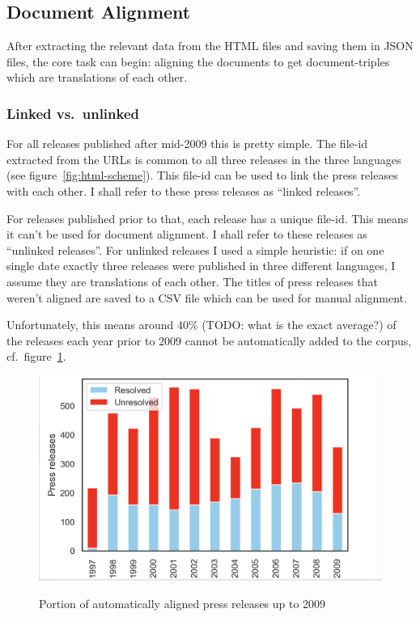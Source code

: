 \subsection{Document Alignment}
After extracting the relevant data from the HTML files and saving them in JSON files, the core task can begin: aligning the documents to get document-triples which are translations of each other.

\subsubsection{Linked vs.~unlinked}
\label{sec:linked-unlinked}
For all releases published after mid-2009 this is pretty simple. 
The file-id extracted from the URLs is common to all three releases in the three languages (see figure~\ref{fig:html-scheme}). 
This file-id can be used to link the press releases with each other. 
I shall refer to these press releases as \enquote{linked releases}.

For releases published prior to that, each release has a unique file-id. 
This means it can't be used for document alignment. 
I shall refer to these releases as \enquote{unlinked releases}.
For unlinked releases I used a simple heuristic: if on one single date exactly three releases were published in three different languages, I assume they are translations of each other. 
The titles of press releases that weren't aligned are saved to a CSV file which can be used for manual alignment.

Unfortunately, this means around 40\% (TODO: what is the exact average?) of the releases each year prior to 2009 cannot be automatically added to the corpus, cf.~figure~\ref{fig:linked-unlinked}.

\begin{figure}[h]
	\centering
	\includegraphics{graphics/linked-unlinked.png}
	\label{fig:linked-unlinked}
	\caption{Portion of automatically aligned press releases up to 2009}
\end{figure}

